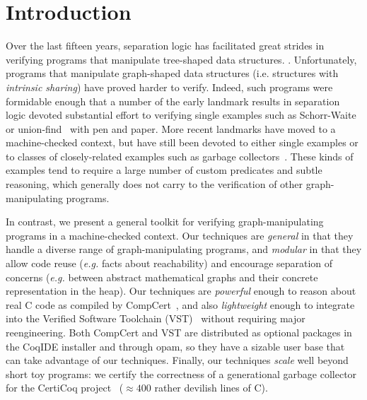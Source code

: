 \documentclass[acmsmall,review,anonymous]{acmart}\settopmatter{printfolios=true,printccs=false,printacmref=false}
\begin{document}





\maketitle

\section{Introduction}
\label{dummyref} \label{sec:intro}
Over the last fifteen years, separation logic has facilitated great strides
in verifying programs that manipulate tree-shaped data structures.
\citep{berdine:smallfoot,chin:hipsleek,jacobs:verifast,
chlipala:bedrock,bengtson:charge,appel:programlogics}.
Unfortunately, programs that manipulate graph-shaped data structures
(i.e. structures with \emph{intrinsic sharing}) have proved harder to verify.
Indeed, such programs were formidable enough that a number of the early
landmark results in separation logic devoted substantial effort to verifying
single examples such as Schorr-Waite~\cite{hongseok:phd} or
union-find~\cite{neelthesis} with pen and paper.
More recent landmarks have moved to a machine-checked context, but have still
been devoted to either single examples or to classes of closely-related examples
such as garbage collectors~\cite{gcexample3,cakemlgc}.
These kinds of examples tend to require a large number
of custom predicates and subtle reasoning, which generally does not carry
to the verification of other graph-manipulating programs.

In contrast, we present a general toolkit for verifying graph-manipulating programs in a
machine-checked context. Our techniques are \emph{general} in that they handle a diverse
range of graph-manipulating programs, and \emph{modular} in that they allow code
reuse (\emph{e.g.} facts about reachability) and encourage separation of concerns
(\emph{e.g.} between abstract mathematical graphs and their concrete representation
in the heap).
Our techniques are \emph{powerful} enough to reason about real C code as compiled by
CompCert~\cite{leroy:compcert}, and also
\emph{lightweight} enough to integrate into the Verified
Software Toolchain (VST)~\cite{appel:programlogics} without requiring major reengineering.
Both CompCert and VST are distributed as optional packages in the CoqIDE installer and through 
opam, so they have a sizable user base that can take advantage of our techniques. Finally, our techniques \emph{scale} well beyond short toy programs: we certify the
correctness of a generational garbage collector for the CertiCoq
project~\cite{certicoqpaper} ($\approx400$ rather devilish lines of C).
\end{document}
